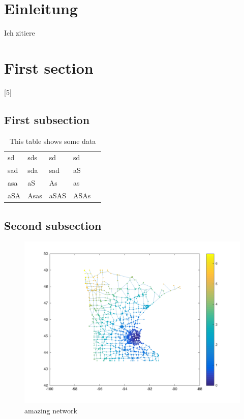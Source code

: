 \documentclass[11pt]{article} %
\begin{document}
\newpage
{}
\thispagestyle{noheader}
\tableofcontents 
\newpage

\section*{Einleitung}
	\blindtext
		\par
	\blindtext
	\par
	Ich zitiere \cite{SomeWebsite}

\section{First section}
	\blindtext
	\subsection{First subsection}
		\blindtext
		\begin{table}[]
		
		\begin{tabular}{|l|l|l|l|l}
		\cline{1-4}
		sd  & sds  & sd   & sd   &  \\ \cline{1-4}
		sad & sda  & sad  & aS   &  \\ \cline{1-4}
		asa & aS   & As   & as   &  \\ \cline{1-4}
		aSA & Asas & aSAS & ASAs &  \\ \cline{1-4}
		\end{tabular}
		\caption{This table shows some data}
	  	\label{tab:myfirsttable}
		\end{table}
	
	\subsection{Second subsection}
		\blindtext
		\begin{figure}[h]
		\centering
		\includegraphics[width=1\textwidth]{abb1.png}
		\caption{amazing network}
		\label{img:abb1}
		\end{figure}\par\blindtext
\end{document}
